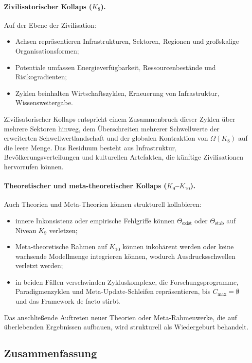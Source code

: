\paragraph{Zivilisatorischer Kollaps (\texorpdfstring{\(K_8\)}{K_8}).}
Auf der Ebene der Zivilisation:
\begin{itemize}
  \item Achsen repräsentieren Infrastrukturen, Sektoren, Regionen und
        großskalige Organisationsformen;
  \item Potentiale umfassen Energieverfügbarkeit, Ressourcenbestände und
        Risikogradienten;
  \item Zyklen beinhalten Wirtschaftszyklen, Erneuerung von Infrastruktur,
        Wissensweitergabe.
\end{itemize}
Zivilisatorischer Kollaps entspricht einem Zusammenbruch dieser Zyklen über
mehrere Sektoren hinweg, dem Überschreiten mehrerer Schwellwerte der
erweiterten Schwellwertlandschaft und der globalen Kontraktion von
\(\Omega(K_8)\) auf die leere Menge. Das Residuum besteht aus
Infrastruktur, Bevölkerungsverteilungen und kulturellen Artefakten, die künftige
Zivilisationen hervorrufen können.

\paragraph{Theoretischer und meta-theoretischer Kollaps (\texorpdfstring{\(K_9\)}{K_9}–\texorpdfstring{\(K_{10}\)}{K_{10}}).}
Auch Theorien und Meta-Theorien können strukturell kollabieren:
\begin{itemize}
  \item innere Inkonsistenz oder empirische Fehlgriffe können
        \(\Theta_{\mathrm{exist}}\) oder \(\Theta_{\mathrm{stab}}\) auf
        Niveau \(K_9\) verletzen;
  \item Meta-theoretische Rahmen auf \(K_{10}\) können inkohärent werden oder
        keine wachsende Modellmenge integrieren können, wodurch
        Ausdrucksschwellen verletzt werden;
  \item in beiden Fällen verschwinden Zykluskomplexe, die Forschungsprogramme,
        Paradigmenzyklen und Meta-Update-Schleifen repräsentieren, bis
        \(C_{\max}=\emptyset\) und das Framework de facto stirbt.
\end{itemize}
Das anschließende Auftreten neuer Theorien oder Meta-Rahmenwerke, die auf
überlebenden Ergebnissen aufbauen, wird strukturell als Wiedergeburt
behandelt.

\subsection{Zusammenfassung}

